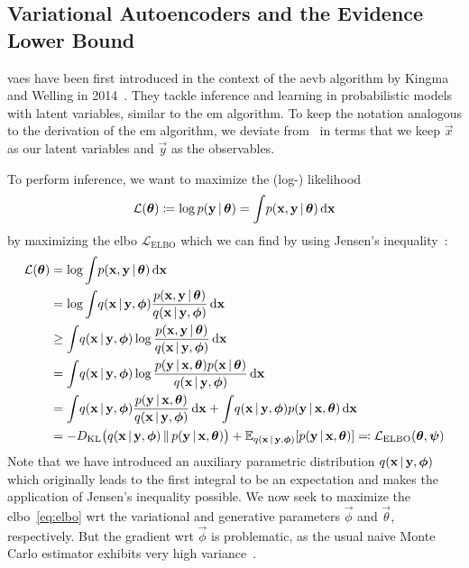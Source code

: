 \subsection{Variational Autoencoders and the Evidence Lower Bound}
	\acp{vae} have been first introduced in the context of the \ac{aevb} algorithm by Kingma and Welling in 2014~\cite{kingmaAutoEncodingVariationalBayes2014}. They tackle inference and learning in probabilistic models with latent variables, similar to the \ac{em} algorithm. To keep the notation analogous to the derivation of the \ac{em} algorithm, we deviate from~\cite{kingmaAutoEncodingVariationalBayes2014} in terms that we keep \(\vec{x}\) as our latent variables and \(\vec{y}\) as the observables.

	To perform inference, we want to maximize the (log-) likelihood
	\begin{align*}
		\mathcal{L}(\boldsymbol{\mathrm{\theta}}) \coloneqq \log p(\boldsymbol{\mathrm{y}} \,\vert\, \boldsymbol{\mathrm{\theta}}) = \int\! p(\boldsymbol{\mathrm{x}}, \boldsymbol{\mathrm{y}} \,\vert\, \boldsymbol{\mathrm{\theta}}) \dd{\boldsymbol{\mathrm{x}}}
	\end{align*}
	by maximizing the \ac{elbo} \( \mathcal{L}_\mathrm{ELBO} \) which we can find by using Jensen's inequality~\cite{jensenFonctionsConvexesInegalites1906}:
	\begin{align}
		\mathcal{L}(\boldsymbol{\mathrm{\theta}})
			&= \log \int\! p(\boldsymbol{\mathrm{x}}, \boldsymbol{\mathrm{y}} \,\vert\, \boldsymbol{\mathrm{\theta}}) \dd{\boldsymbol{\mathrm{x}}}  \nonumber \\
			&= \log \int\! q(\boldsymbol{\mathrm{x}} \,\vert\, \boldsymbol{\mathrm{y}}, \boldsymbol{\mathrm{\phi}}) \frac{p(\boldsymbol{\mathrm{x}}, \boldsymbol{\mathrm{y}} \,\vert\, \boldsymbol{\mathrm{\theta}})}{q(\boldsymbol{\mathrm{x}} \,\vert\, \boldsymbol{\mathrm{y}}, \boldsymbol{\mathrm{\phi}})} \dd{\boldsymbol{\mathrm{x}}}  \nonumber \\
			&\geq \int\! q(\boldsymbol{\mathrm{x}} \,\vert\, \boldsymbol{\mathrm{y}}, \boldsymbol{\mathrm{\phi}}) \log \frac{p(\boldsymbol{\mathrm{x}}, \boldsymbol{\mathrm{y}} \,\vert\, \boldsymbol{\mathrm{\theta}})}{q(\boldsymbol{\mathrm{x}} \,\vert\, \boldsymbol{\mathrm{y}}, \boldsymbol{\mathrm{\phi}})} \dd{\boldsymbol{\mathrm{x}}}  \nonumber \\
			&= \int\! q(\boldsymbol{\mathrm{x}} \,\vert\, \boldsymbol{\mathrm{y}}, \boldsymbol{\mathrm{\phi}}) \log \frac{p(\boldsymbol{\mathrm{y}} \,\vert\, \boldsymbol{\mathrm{x}}, \boldsymbol{\mathrm{\theta}}) p(\boldsymbol{\mathrm{x}} \,\vert\, \boldsymbol{\mathrm{\theta}})}{q(\boldsymbol{\mathrm{x}} \,\vert\, \boldsymbol{\mathrm{y}}, \boldsymbol{\mathrm{\phi}})} \dd{\boldsymbol{\mathrm{x}}}  \nonumber \\
			&= \int\! q(\boldsymbol{\mathrm{x}} \,\vert\, \boldsymbol{\mathrm{y}}, \boldsymbol{\mathrm{\phi}}) \frac{p(\boldsymbol{\mathrm{y}} \,\vert\, \boldsymbol{\mathrm{x}}, \boldsymbol{\mathrm{\theta}})}{q(\boldsymbol{\mathrm{x}} \,\vert\, \boldsymbol{\mathrm{y}}, \boldsymbol{\mathrm{\phi}})} \dd{\boldsymbol{\mathrm{x}}} + \int\! q(\boldsymbol{\mathrm{x}} \,\vert\, \boldsymbol{\mathrm{y}}, \boldsymbol{\mathrm{\phi}}) p(\boldsymbol{\mathrm{y}} \,\vert\, \boldsymbol{\mathrm{x}}, \boldsymbol{\mathrm{\theta}}) \dd{\boldsymbol{\mathrm{x}}}  \nonumber \\
			&= -D_\mathrm{KL}\big( q(\boldsymbol{\mathrm{x}} \,\vert\, \boldsymbol{\mathrm{y}}, \boldsymbol{\mathrm{\phi}}) \,\Vert\, p(\boldsymbol{\mathrm{y}} \,\vert\, \boldsymbol{\mathrm{x}}, \boldsymbol{\mathrm{\theta}}) \big) + \mathbb{E}_{q(\boldsymbol{\mathrm{x}} \,\vert\, \boldsymbol{\mathrm{y}}, \boldsymbol{\mathrm{\phi}})}[p(\boldsymbol{\mathrm{y}} \,\vert\, \boldsymbol{\mathrm{x}}, \boldsymbol{\mathrm{\theta}})] \eqqcolon \mathcal{L}_\mathrm{ELBO}(\boldsymbol{\mathrm{\theta}}, \boldsymbol{\mathrm{\psi}})  \label{eq:elbo}
	\end{align}
	Note that we have introduced an auxiliary parametric distribution \( q(\boldsymbol{\mathrm{x}} \,\vert\, \boldsymbol{\mathrm{y}}, \boldsymbol{\mathrm{\phi}}) \) which originally leads to the first integral to be an expectation and makes the application of Jensen's inequality possible. We now seek to maximize the \ac{elbo}~\eqref{eq:elbo} \ac{wrt} the variational and generative parameters \(\vec{\phi}\) and \(\vec{\theta}\), respectively. But the gradient \ac{wrt} \(\vec{\phi}\) is problematic, as the usual naive Monte Carlo estimator exhibits very high variance~\cite{kingmaAutoEncodingVariationalBayes2014,paisleyVariationalBayesianInference2012a}.

